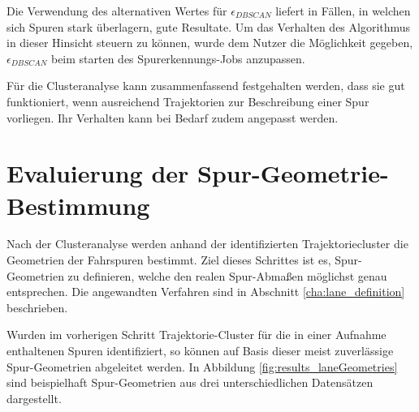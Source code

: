 Die Verwendung des alternativen Wertes für $\epsilon_{DBSCAN}$ liefert in Fällen, in welchen sich Spuren stark überlagern,
gute Resultate. Um das Verhalten des Algorithmus in dieser Hinsicht steuern zu können, wurde dem Nutzer die Möglichkeit
gegeben, $\epsilon_{DBSCAN}$ beim starten des Spurerkennungs-Jobs anzupassen.

Für die Clusteranalyse kann zusammenfassend festgehalten werden, dass sie gut funktioniert, wenn ausreichend Trajektorien
zur Beschreibung einer Spur vorliegen. Ihr Verhalten kann bei Bedarf zudem angepasst werden.

\section{Evaluierung der Spur-Geometrie-Bestimmung}

Nach der Clusteranalyse werden anhand der identifizierten Trajektoriecluster die Geometrien der Fahrspuren
bestimmt. Ziel dieses Schrittes ist es, Spur-Geometrien zu definieren, welche den realen Spur-Abmaßen möglichst
genau entsprechen. Die angewandten Verfahren sind in Abschnitt \ref{cha:lane_definition} beschrieben.

Wurden im vorherigen Schritt Trajektorie-Cluster für die in einer Aufnahme enthaltenen Spuren identifiziert,
so können auf Basis dieser meist zuverlässige Spur-Geometrien abgeleitet werden.
In Abbildung \ref{fig:results_laneGeometries} sind beispielhaft Spur-Geometrien aus drei unterschiedlichen Datensätzen dargestellt.

